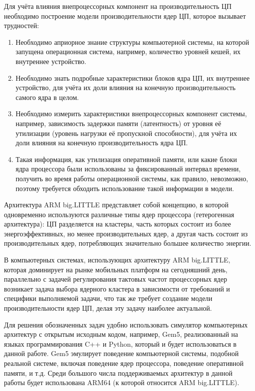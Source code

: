     Для учёта влияния внепроцессорных компонент на производительность ЦП необходимо построение
    модели производительности ядер ЦП, которое вызывает трудностей:
    \begin{enumerate}
        \item Необходимо априорное знание структуры компьютерной системы, на которой запущена
        операционная система, например, количество уровней кешей, их внутреннее устройство.
        \item Необходимо знать подробные характеристики блоков ядра ЦП, их внутреннее устройство, для
        учёта их доли влияния на конечную производительность самого ядра в целом.
        \item Необходимо измерить характеристики внепроцессорных компонент системы,
        например, зависимость задержки памяти (латентность) от уровня её утилизации (уровень
        нагрузки её пропускной способности), для учёта их доли влияния на конечную
        производительность ядра ЦП.
        \item Такая информация, как утилизация оперативной памяти, или какие блоки ядра процессора
        были использованы за фиксированный интервал времени, получить во время работы операционной
        системы, как правило, невозможно, поэтому требуется обходить использование такой информации
        в модели.
    \end{enumerate}

    Архитектура ARM big.LITTLE представляет собой концепцию, в которой одновременно
    используются различные типы ядер процессора (гетерогенная архитектура): ЦП разделяется на
    кластеры, часть которых состоит из более энергоэффективных, но менее производительных ядер,
    а другая часть состоит из производительных ядер, потребляющих значительно большее
    количество энергии.

    В компьютерных системах, использующих архитектуру ARM big.LITTLE, которая доминирует на рынке
    мобильных платформ на сегодняшний день, параллельно с задачей регулирования тактовых частот
    процессорных ядер возникает задача выбора ядерного кластера в зависимости от требований и
    специфики выполняемой задачи, что так же требует создание модели производительности ядер ЦП,
    делая эту задачу наиболее актуальной.

    Для решения обозначенных задач удобно использовать симулятор компьютерных
    архитектур с открытым исходным кодом, например, Gem5, реализованный на языках программирования
    C++ и Python, который и будет использоваться в
    данной работе. Gem5 эмулирует поведение компьютерной системы, подобной реальной системе,
    включая поведение ядер процессора, поведение оперативной памяти, и т.д. Среди большого числа
    поддерживаемых архитектур в данной работы будет использована ARM64 (к которой относится
    ARM big.LITTLE).

